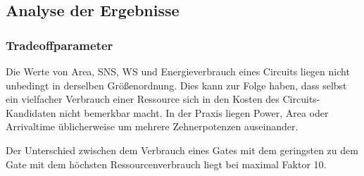 \documentclass[11pt, a4paper, german]{article}
\begin{document}
 \subsection{Analyse der Ergebnisse}
 \label{subsec:analyse_der_ergebnisse}

\subsubsection{Tradeoffparameter}
Die Werte von Area, SNS, WS und Energieverbrauch eines Circuits liegen nicht unbedingt in derselben Größenordnung. Dies kann zur Folge haben, dass selbst ein vielfacher Verbrauch einer Ressource sich in den Kosten des Circuits-Kandidaten nicht bemerkbar macht. In der Praxis liegen Power, Area oder Arrivaltime \"ublicherweise um mehrere Zehnerpotenzen auseinander. 

Der Unterschied zwischen dem Verbrauch eines Gates mit dem geringsten zu dem Gate mit dem höchsten Ressourcenverbrauch liegt bei maximal Faktor 10.
\end{document}
